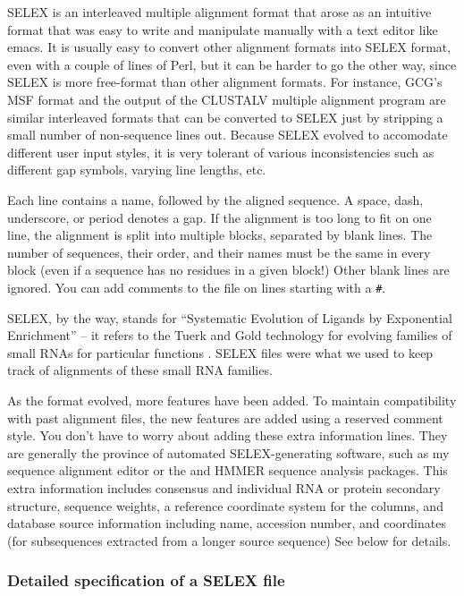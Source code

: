 SELEX is an interleaved multiple alignment format that arose as an
intuitive format that was easy to write and manipulate manually with a
text editor like emacs. It is usually easy to convert other alignment
formats into SELEX format, even with a couple of lines of Perl, but it
can be harder to go the other way, since SELEX is more free-format
than other alignment formats. For instance, GCG's MSF format and the
output of the CLUSTALV multiple alignment program are similar
interleaved formats that can be converted to SELEX just by stripping a
small number of non-sequence lines out. Because SELEX evolved to
accomodate different user input styles, it is very tolerant of various
inconsistencies such as different gap symbols, varying line lengths,
etc.

Each line contains a name, followed by the aligned sequence. A space,
dash, underscore, or period denotes a gap. If the alignment is too
long to fit on one line, the alignment is split into multiple blocks,
separated by blank lines. The number of sequences, their order, and
their names must be the same in every block (even if a sequence has no
residues in a given block!) Other blank lines are ignored. You can add
comments to the file on lines starting with a \verb+#+.

SELEX, by the way, stands for ``Systematic Evolution of Ligands by
Exponential Enrichment'' -- it refers to the Tuerk and Gold technology
for evolving families of small RNAs for particular functions
\cite{Tuerk90b}. SELEX files were what we used to keep track of
alignments of these small RNA families.

As the format evolved, more features have been added. To maintain
compatibility with past alignment files, the new features are added
using a reserved comment style. You don't have to worry about adding
these extra information lines. They are generally the province of
automated SELEX-generating software, such as my  sequence
alignment editor or the  and HMMER sequence analysis
packages. This extra information includes consensus and individual RNA
or protein secondary structure, sequence weights, a reference
coordinate system for the columns, and database source information
including name, accession number, and coordinates (for subsequences
extracted from a longer source sequence) See below for details.

\subsubsection {Detailed specification of a SELEX file}

